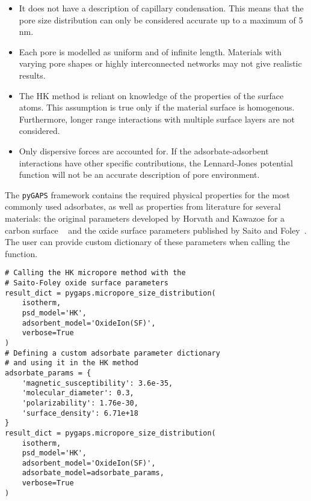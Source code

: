 \begin{itemize}

	\item It does not have a description of capillary condensation. This means that the
	      pore size distribution can only be considered accurate up to a maximum of 5 nm.
	\item Each pore is modelled as uniform and of infinite length. Materials with varying pore
	      shapes or highly interconnected networks may not give realistic results.
	\item The HK method is reliant on knowledge of the properties of the surface atoms.
	      This assumption is true only if the material surface is homogenous. Furthermore,
	      longer range interactions with multiple surface layers are not considered.
	\item Only dispersive forces are accounted for. If the adsorbate-adsorbent interactions
	      have other specific contributions, the Lennard-Jones potential function will not be
	      an accurate description of pore environment.

\end{itemize}

The \texttt{pyGAPS} framework contains the required physical properties for the most commonly
used adsorbates, as well as properties from literature for several materials:
the original parameters developed by Horvath and Kawazoe for a carbon surface
~\cite{horvathMethodCalculationEffective1983} and the oxide surface parameters
published by Saito and Foley~\cite{saitoCurvatureParametricSensitivity1991}.
The user can provide custom dictionary of these parameters when calling the
function.

\begin{lstlisting}[caption={Using the HK method for PSD},label={pyg:lst:hkpsd}]
# Calling the HK micropore method with the 
# Saito-Foley oxide surface parameters
result_dict = pygaps.micropore_size_distribution(
    isotherm,
    psd_model='HK',
    adsorbent_model='OxideIon(SF)',
    verbose=True
)
# Defining a custom adsorbate parameter dictionary 
# and using it in the HK method
adsorbate_params = {
    'magnetic_susceptibility': 3.6e-35,
    'molecular_diameter': 0.3,
    'polarizability': 1.76e-30,
    'surface_density': 6.71e+18
}
result_dict = pygaps.micropore_size_distribution(
    isotherm,
    psd_model='HK',
    adsorbent_model='OxideIon(SF)',
    adsorbate_model=adsorbate_params,
    verbose=True
)

\end{lstlisting}

